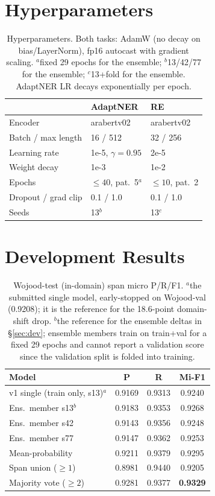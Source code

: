 \documentclass[11pt]{article}
\begin{document}
\appendix

\section{Hyperparameters}
\label{app:hyper}

\begin{table}[H]
\centering
\small
\begin{tabular}{lll}
\toprule
 & \textbf{AdaptNER} & \textbf{RE} \\
\midrule
Encoder & arabertv02 & arabertv02 \\
Batch / max length & 16 / 512 & 32 / 256 \\
Learning rate & 1e-5, $\gamma{=}0.95$ & 2e-5 \\
Weight decay & 1e-3 & 1e-2 \\
Epochs & ${\leq}40$, pat.~5$^{a}$ & ${\leq}10$, pat.~2 \\
Dropout / grad clip & 0.1 / 1.0 & 0.1 / 1.0 \\
Seeds & 13$^{b}$ & 13$^{c}$ \\
\bottomrule
\end{tabular}
\caption{Hyperparameters. Both tasks: AdamW (no decay on
bias/LayerNorm), fp16 autocast with gradient scaling. $^{a}$fixed 29
epochs for the ensemble; $^{b}$13/42/77 for the ensemble; $^{c}$13+fold
for the ensemble. AdaptNER LR decays exponentially per epoch.}
\label{tab:hyper}
\end{table}

\section{Development Results}

\begin{table}[H]
\centering
\small
\setlength{\tabcolsep}{3.5pt}
\begin{tabular}{lccc}
\toprule
\textbf{Model} & \textbf{P} & \textbf{R} & \textbf{Mi-F1} \\
\midrule
v1 single (train only, s13)$^{a}$ & 0.9169 & 0.9313 & 0.9240 \\
Ens.\ member s13$^{b}$ & 0.9183 & 0.9353 & 0.9268 \\
Ens.\ member s42 & 0.9143 & 0.9356 & 0.9248 \\
Ens.\ member s77 & 0.9147 & 0.9362 & 0.9253 \\
Mean-probability & 0.9211 & 0.9379 & 0.9295 \\
Span union (${\geq}1$) & 0.8981 & 0.9440 & 0.9205 \\
Majority vote (${\geq}2$) & 0.9281 & 0.9377 & \textbf{0.9329} \\
\bottomrule
\end{tabular}
\caption{Wojood-test (in-domain) span micro P/R/F1. $^{a}$the submitted
single model, early-stopped on Wojood-val (0.9208); it is the reference
for the 18.6-point domain-shift drop. $^{b}$the reference for the
ensemble deltas in \S\ref{sec:dev}; ensemble members train on train+val for a
fixed 29 epochs and cannot report a validation score since the
validation split is folded into training.}
\label{tab:nerdev}
\end{table}
\end{document}
